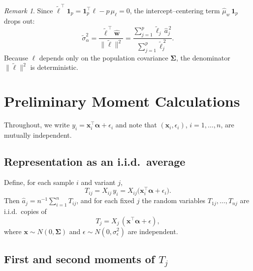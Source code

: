\documentclass[11pt]{article}
\newcommand{\one}{\mathbf{1}}
\newcommand{\bSig}{\boldsymbol{\Sigma}}
\newcommand{\balpha}{\boldsymbol{\alpha}}
\newcommand{\bx}{\mathbf{x}}
\theoremstyle{plain}
\theoremstyle{definition}
\theoremstyle{remark}
\newtheorem{remark}[theorem]{Remark}
\begin{document}
\begin{remark}\label{rem:center}
Since
$\widetilde{\boldsymbol{\ell}}^{\,\top}\one_p
= \one_p^\top\boldsymbol{\ell} - p\,\mu_\ell = 0$,
the intercept--centering term $\widehat\mu_w\,\one_p$ drops out:
\begin{equation}\label{eq:reduced}
    \widetilde\sigma_\alpha^2
    = \frac{\widetilde{\boldsymbol{\ell}}^{\,\top}\widehat{\mathbf{w}}}
           {\|\widetilde{\boldsymbol{\ell}}\|^2}
    = \frac{\displaystyle\sum_{j=1}^{p}\widetilde\ell_j\,\widehat{a}_j^{\,2}}
           {\displaystyle\sum_{j=1}^{p}\widetilde\ell_j^{\,2}} .
\end{equation}
Because $\boldsymbol{\ell}$ depends only on the population covariance
$\bSig$, the denominator $\|\widetilde{\boldsymbol{\ell}}\|^2$ is
deterministic.
\end{remark}

\section{Preliminary Moment Calculations}

Throughout, we write $y_i = \bx_i^\top\balpha + \epsilon_i$ and
note that $(\bx_i,\epsilon_i)$, $i=1,\dots,n$, are mutually
independent.

\subsection{Representation as an i.i.d.\ average}
Define, for each sample $i$ and variant $j$,
\begin{equation}\label{eq:Tij}
    T_{ij} = X_{ij}\,y_i
           = X_{ij}\bigl(\bx_i^\top\balpha + \epsilon_i\bigr).
\end{equation}
Then $\widehat{a}_j = n^{-1}\sum_{i=1}^n T_{ij}$,
and for each fixed $j$ the random variables $T_{1j},\dots,T_{nj}$
are i.i.d.\ copies of
\begin{equation}\label{eq:Tj}
    T_j = X_j\,(\bx^\top\balpha + \epsilon),
\end{equation}
where $\bx\sim N(0,\bSig)$ and $\epsilon\sim N(0,\sigma_\epsilon^2)$
are independent.

\subsection{First and second moments of $T_j$}
\end{document}
